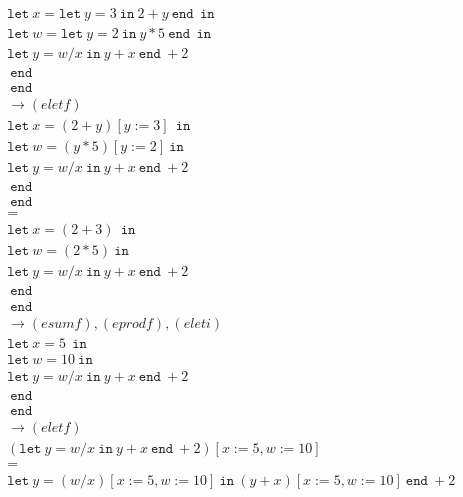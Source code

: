 \documentclass{article}
\begin{document}
\begin{enumerate}
{\begin{enumerate}
{        	\begin{align*}
        	&\texttt{let} \ x = \texttt{let} \ y = 3 \ \texttt{in} \ 2 + y \ \texttt{end} \  \ \texttt{in} \\\
        	&\texttt{let} \ w = \texttt{let} \ y = 2 \ \texttt{in} \ y * 5 \ \texttt{end} \  \ \texttt{in} \\\
        	&\texttt{let} \ y = w / x \ \texttt{in} \ y + x \ \texttt{end} \  + 2\\
        	&\ \texttt{end} \ \\
        	&\ \texttt{end} \ \\
        	&\rightarrow (eletf) \\
        	&\texttt{let} \ x = (2 + y)[y:=3] \ \ \texttt{in} \\
        	&\texttt{let} \ w =  (y * 5)[y:=2] \ \texttt{in} \\
        	&\texttt{let} \ y = w / x \ \texttt{in} \ y + x \ \texttt{end} \  + 2\\
        	&\ \texttt{end} \ \\
        	&\ \texttt{end} \ \\
        	&= \\
        	&\texttt{let} \ x = (2 + 3) \ \ \texttt{in} \\
        	&\texttt{let} \ w =  (2 * 5) \ \texttt{in} \\
        	&\texttt{let} \ y = w / x \ \texttt{in} \ y + x \ \texttt{end} \  + 2\\
        	&\ \texttt{end} \ \\
        	&\ \texttt{end} \ \\
        	&\rightarrow (esumf), (eprodf), (eleti) \\
        	&\texttt{let} \ x = 5 \ \ \texttt{in} \\
        	&\texttt{let} \ w =  10 \ \texttt{in} \\
        	&\texttt{let} \ y = w / x \ \texttt{in} \ y + x \ \texttt{end} \  + 2\\
        	&\ \texttt{end} \ \\
        	&\ \texttt{end} \ \\
        	&\rightarrow (eletf) \\
        	&(\texttt{let} \ y = w / x \ \texttt{in} \ y + x \ \texttt{end} \  + 2)
        	[x := 5, w := 10]\\
        	&= \\
        	&\texttt{let} \ y = (w / x)[x := 5, w := 10] \ \texttt{in} \ 
        	(y + x) [x := 5, w := 10] \ \texttt{end} \  + 2 \\

\end{align*}}
\end{enumerate}}
\end{enumerate}
\end{document}
